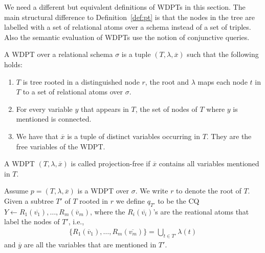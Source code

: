 We need a different but equivalent definitions of WDPTs in this section. The
main structural difference to Definition~\ref{def:pt} is that the nodes in the
tree are labelled with a set
of relational atoms over a schema instead of a set of triples. Also the semantic
evaluation of WDPTs use the notion of conjunctive queries.

\begin{definition}\label{def:wdpt}
	A WDPT over a relational schema $\sigma$ is a tuple $(T, \lambda, \overline{x})$
	such that the following holds:
	\begin{enumerate}
		\item $T$ is tree rooted in a distinguished node $r$, the root and $\lambda$
			maps each node $t$ in $T$ to a set of relational atoms over $\sigma$.
		\item For every variable $y$ that appears in $T$, the set of nodes of $T$ where
			$y$ is mentioned is connected.
		\item We have that $\overline{x}$ is a tuple of distinct variables occurring in
			$T$. They are the free variables of the WDPT.
	\end{enumerate}
\end{definition}

\begin{definition}
	A WDPT $(T,\lambda, \overline{x})$ is called projection-free if $\overline{x}$
	contains all variables mentioned in $T$.
\end{definition}

\begin{definition}\label{wdptq}
	Assume $p = (T,\lambda,\overline{x})$ is a WDPT over $\sigma$. We write $r$ to
	denote the root of $T$. Given a subtree $T'$ of $T$ rooted in $r$ we define
	$q_{T'}$ to be the CQ $Y \leftarrow R_1(\overline{v_1}), \dots,
	R_m(\overline{v}_m)$, where the $R_i(\overline{v_i})$'s are the reational atoms
	that label the nodes of $T'$, i.e., 
	\begin{align*}
		\{ R_1(\overline{v}_1), \dots, R_m(\overline{v_m}) \} = \bigcup_{t \in T'} \lambda(t) 
	\end{align*} and $\overline{y}$ are all the variables that are mentioned in
	$T'$. 
\end{definition}


